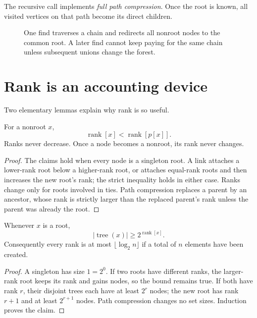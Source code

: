 The recursive call implements \emph{full path compression}. Once the root is known, all visited vertices on that path become its direct children.

\begin{figure}[htbp]
\centering
{}
\caption{One find traverses a chain and redirects all nonroot nodes to the common root. A later find cannot keep paying for the same chain unless subsequent unions change the forest.}
\label{fig:N20261108-compression}
\end{figure}

\section{Rank is an accounting device}

Two elementary lemmas explain why rank is so useful.

\begin{lemma}
For a nonroot \(x\),
\[
 \operatorname{rank}[x]<
 \operatorname{rank}[p[x]].
\]
Ranks never decrease. Once a node becomes a nonroot, its rank never changes.
\end{lemma}
\begin{proof}
The claims hold when every node is a singleton root. A link attaches a lower-rank root below a higher-rank root, or attaches equal-rank roots and then increases the new root's rank; the strict inequality holds in either case. Ranks change only for roots involved in ties. Path compression replaces a parent by an ancestor, whose rank is strictly larger than the replaced parent's rank unless the parent was already the root.
\end{proof}

\begin{lemma}
Whenever \(x\) is a root,
\[
 |\operatorname{tree}(x)|\geq2^{\operatorname{rank}[x]}.
\]
Consequently every rank is at most \(\lfloor\log_2 n\rfloor\) if a total of \(n\) elements have been created.
\end{lemma}
\begin{proof}
A singleton has size \(1=2^0\). If two roots have different ranks, the larger-rank root keeps its rank and gains nodes, so the bound remains true. If both have rank \(r\), their disjoint trees each have at least \(2^r\) nodes; the new root has rank \(r+1\) and at least \(2^{r+1}\) nodes. Path compression changes no set sizes. Induction proves the claim.
\end{proof}

